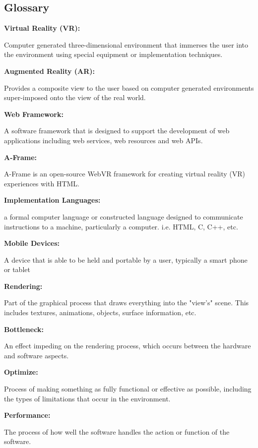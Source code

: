 \documentclass[letterpaper,10pt,titlepage,draftclsnofoot,onecolumn,compsoc,utf8,latin1]{IEEEtran}
\begin{document}
\subsection{Glossary}
\begin{singlespace}

\begin{enumerate}
    {\item \bfseries Virtual Reality (VR): } Computer generated three-dimensional environment that immerses the user into the environment using special equipment or implementation techniques.
    {\item \bfseries Augmented Reality (AR): } Provides a composite view to the user based on computer generated environments super-imposed onto the view of the real world.
    {\item \bfseries Web Framework: } A software framework that is designed to support the development of web applications including web services, web resources and web APIs. \\
    {\item \bfseries A-Frame: } A-Frame is an open-source WebVR framework for creating virtual reality (VR) experiences with HTML.\\
    {\item \bfseries Implementation Languages: } a formal computer language or constructed language designed to communicate instructions to a machine, particularly a computer. i.e. HTML, C, C++, etc. \\
    {\item \bfseries Mobile Devices: } A device that is able to be held and portable by a user, typically a smart phone or tablet \\
    {\item \bfseries Rendering: } Part of the graphical process that draws everything into the "view's" scene. This includes textures, animations, objects, surface information, etc. \\
    {\item \bfseries Bottleneck: } An effect impeding on the rendering process, which occurs between the hardware and software aspects. \\
    {\item \bfseries Optimize: } Process of making something as fully functional or effective as possible, including the types of limitations that occur in the environment. \\
    {\item \bfseries Performance: } The process of how well the software handles the action or function of the software. \\
\end{enumerate}

\end{singlespace}
\end{document}
